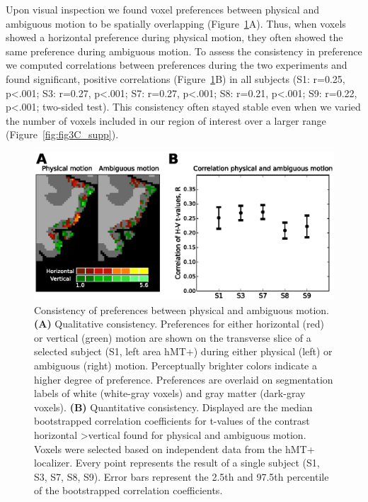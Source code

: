 Upon visual inspection we found voxel preferences between physical and ambiguous motion to be spatially overlapping (Figure~\ref{fig:consistency}A). Thus, when voxels showed a horizontal preference during physical motion, they often showed the same preference during ambiguous motion. To assess the consistency in preference we computed correlations between preferences during the two experiments and found significant, positive correlations (Figure~\ref{fig:consistency}B) in all subjects (S1: r=0.25, p\textless.001; S3: r=0.27, p\textless.001; S7: r=0.27, p\textless.001; S8: r=0.21, p\textless.001; S9: r=0.22, p\textless.001; two-sided test). This consistency often stayed stable even when we varied the number of voxels included in our region of interest over a larger range (Figure~\ref{fig:fig3C_supp}).

\begin{figure}[htb!]
\centering
\includegraphics[width=\textwidth]{figures/chapter_03/fig3.eps}
\caption{Consistency of preferences between physical and ambiguous motion. \textbf{(A)} Qualitative consistency. Preferences for either horizontal (red) or vertical (green) motion are shown on the transverse slice of a selected subject (S1, left area hMT+) during either physical (left) or ambiguous (right) motion. Perceptually brighter colors indicate a higher degree of preference. Preferences are overlaid on segmentation labels of white (white-gray voxels) and gray matter (dark-gray voxels). \textbf{(B)} Quantitative consistency. Displayed are the median bootstrapped correlation coefficients for t-values of the contrast horizontal \textgreater vertical found for physical and ambiguous motion. Voxels were selected based on independent data from the hMT+ localizer. Every point represents the result of a single subject (S1, S3, S7, S8, S9). Error bars represent the 2.5th and 97.5th percentile of the bootstrapped correlation coefficients.}
\label{fig:consistency}
\end{figure}


